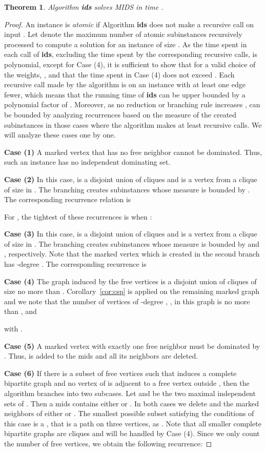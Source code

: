 \documentclass[a4paper,10pt]{article}
\theoremstyle{plain}
\newtheorem{theorem}{Theorem}
\theoremstyle{definition}
\theoremstyle{remark}
\newcommand{\ids}{independent dominating set\xspace}
\newcommand{\MIDSpb}{\textsc{MIDS}\xspace}
\newcommand{\mids}{mids\xspace}
\begin{document}
\begin{theorem}
\label{upperbound}
Algorithm {\bf ids} solves \MIDSpb in time .
\end{theorem}
\begin{proof}
An instance  is \emph{atomic} if Algorithm \textbf{ids} does not make a recursive call on input .
Let  denote the maximum number of atomic subinstances recursively processed to compute a
solution for an instance of size . As the time spent in each call of {\bf ids}, excluding the time
spent by the corresponding recursive calls, is polynomial, except for Case (4), it is sufficient to show
that for a valid choice of the weights, , and that the time spent in Case (4) does not exceed . Each recursive call made
by the algorithm is on an instance with at least one edge fewer, which means that the
running time of {\bf ids} can be upper bounded by a polynomial factor of . Moreover, as no reduction or
branching rule increases ,  can be bounded
by analyzing recurrences
based on the measure of the created subinstances in those cases where the algorithm makes
at least  recursive calls.
We will analyze these cases one by one.

{\bf Case (1)}
A marked vertex that has no free neighbor cannot be dominated. Thus, such an instance has no \ids.

{\bf Case (2)}
In this case,  is a disjoint union of cliques and  is a vertex from a clique
of size  in . The branching  creates  subinstances
whose measure is bounded by . The corresponding recurrence relation is

For , the tightest of these recurrences is when :


{\bf Case (3)}
In this case,  is a disjoint union of cliques and  is a vertex from a clique
of size  in . The branching  creates  subinstances
whose measure is bounded by  and , respectively. Note that the marked vertex which is created in the second branch has -degree . The corresponding recurrence is


{\bf Case (4)} The graph induced by the free vertices is a disjoint union of cliques of size no more
than . Corollary~\ref{cor:csp} is applied on the remaining marked graph and we note that
the number  of vertices of -degree , , in this graph is no more than
,
 and

with .


{\bf Case (5)}
A marked vertex  with exactly one free neighbor  must be dominated by . Thus,  is added to the \mids and all
its neighbors are deleted.

{\bf Case (6)}
If there is a subset  of free vertices such that  induces a complete bipartite
graph and no vertex of  is adjacent to a free vertex outside , then the algorithm branches
into two subcases. Let  and  be the two maximal independent sets of . Then
a \mids contains either  or . In both cases we delete 
and the marked neighbors of either  or .
The smallest possible subset  satisfying the conditions of this case
is a , that is a path on three vertices,
as . Note that all smaller complete bipartite graphs are cliques and will be handled by Case (4).
Since we only count the number of free vertices, we obtain the following recurrence:


\end{proof}
\end{document}
